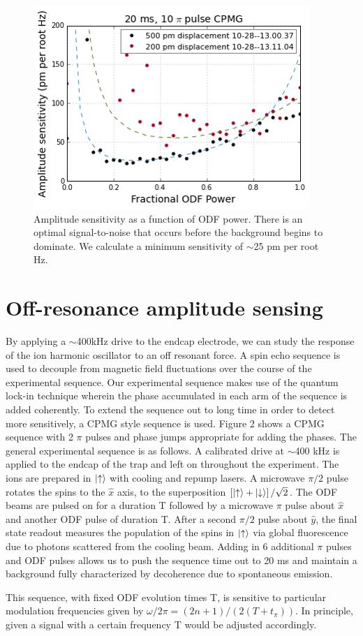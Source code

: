 \documentclass[aps,prl,twocolumn,groupedaddress]{revtex4-1}
\begin{document}
\begin{figure}
\includegraphics[width=.25\textwidth]{amp_sense_both}
\caption{Amplitude sensitivity as a function of ODF power. There is an optimal signal-to-noise that occurs before the background begins to dominate. We calculate a minimum sensitivity of $\sim$25 pm per root Hz.}\label{Fig 4}
\end{figure}
\section{Off-resonance amplitude sensing}
By applying a $\sim$400kHz drive to the endcap electrode, we can study the response of the ion harmonic oscillator to an off resonant force. A spin echo sequence is used to decouple from magnetic field fluctuations over the course of the experimental sequence. Our experimental sequence makes use of the quantum lock-in technique wherein the phase accumulated in each arm of the sequence is added coherently. To extend the sequence out to long time in order to detect more sensitively, a CPMG style sequence is used. Figure 2 shows a CPMG sequence with 2 $\pi$ pulses and phase jumps appropriate for adding the phases. The general experimental sequence is as follows. A calibrated drive at $\sim$400 kHz is applied to the endcap of the trap and left on throughout the experiment. The ions are prepared in $\ket{\uparrow}$ with cooling and repump lasers. A microwave $\pi/2$ pulse rotates the spins to the $\hat{x}$ axis, to the superposition $\left[\ket{\uparrow} + \ket{\downarrow}\right]/\sqrt{2}$. The ODF beams are pulsed on for a duration T followed by a microwave $\pi$ pulse about $\hat{x}$ and another ODF pulse of duration T. After a second $\pi/2$ pulse about $\hat{y}$, the final state readout measures the population of the spins in $\ket{\uparrow}$ via global fluorescence due to photons scattered from the cooling beam. Adding in 6 additional $\pi$ pulses and ODF pulses allows us to push the sequence time out to 20 ms and maintain a background fully characterized by decoherence due to spontaneous emission.

This sequence, with fixed ODF evolution times T, is sensitive to particular modulation frequencies given by $ \omega/2\pi = (2n+1)/(2(T+t_{\pi}))$. In principle, given a signal with a certain frequency T would be adjusted accordingly.
\end{document}
